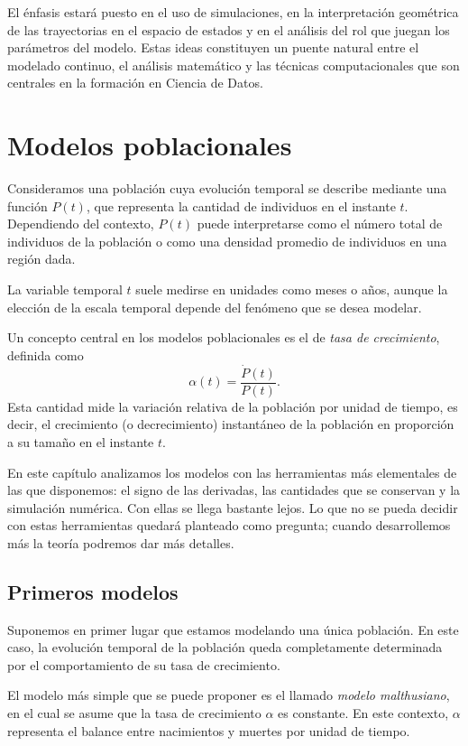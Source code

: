 \documentclass[12pt, a4paper]{amsbook}
\theoremstyle{remark}
\theoremstyle{definition}
\numberwithin{section}{chapter}
\numberwithin{subsection}{section}
\numberwithin{equation}{section}
\numberwithin{figure}{chapter}
\begin{document}
El énfasis estará puesto en el uso de simulaciones, en la interpretación geométrica de las trayectorias en el espacio de estados y en el análisis del rol que juegan los parámetros del modelo. Estas ideas constituyen un puente natural entre el modelado continuo, el análisis matemático y las técnicas computacionales que son centrales en la formación en Ciencia de Datos.

\chapter{Modelos poblacionales}\label{cap1}

Consideramos una población cuya evolución temporal se describe mediante una función $P(t)$, que representa la cantidad de individuos en el instante $t$. Dependiendo del contexto, $P(t)$ puede interpretarse como el número total de individuos de la población o como una densidad promedio de individuos en una región dada.

La variable temporal $t$ suele medirse en unidades como meses o años, aunque la elección de la escala temporal depende del fenómeno que se desea modelar.

Un concepto central en los modelos poblacionales es el de \emph{tasa de crecimiento}, definida como
$$
\alpha(t) = \frac{\dot P(t)}{P(t)}.
$$
Esta cantidad mide la variación relativa de la población por unidad de tiempo, es decir, el crecimiento (o decrecimiento) instantáneo de la población en proporción a su tamaño en el instante $t$.

En este capítulo analizamos los modelos con las herramientas más elementales de las que disponemos: el signo de las derivadas, las cantidades que se conservan y la simulación numérica. Con ellas se llega bastante lejos. Lo que no se pueda decidir con estas herramientas quedará planteado como pregunta; cuando desarrollemos más la teoría podremos dar más detalles.

\section{Primeros modelos}
Suponemos en primer lugar que estamos modelando una única población. En este caso, la evolución temporal de la población queda completamente determinada por el comportamiento de su tasa de crecimiento.

El modelo más simple que se puede proponer es el llamado \emph{modelo malthusiano}, en el cual se asume que la tasa de crecimiento $\alpha$ es constante. En este contexto, $\alpha$ representa el balance entre nacimientos y muertes por unidad de tiempo.
\end{document}
